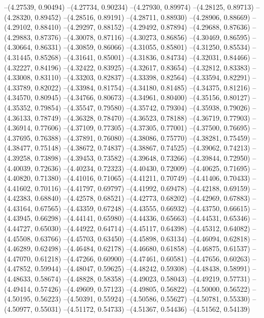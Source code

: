 --(4.27539, 0.90494)
--(4.27734, 0.90234)
--(4.27930, 0.89974)
--(4.28125, 0.89713)
--(4.28320, 0.89452)
--(4.28516, 0.89191)
--(4.28711, 0.88930)
--(4.28906, 0.88669)
--(4.29102, 0.88410)
--(4.29297, 0.88152)
--(4.29492, 0.87894)
--(4.29688, 0.87636)
--(4.29883, 0.87376)
--(4.30078, 0.87116)
--(4.30273, 0.86856)
--(4.30469, 0.86595)
--(4.30664, 0.86331)
--(4.30859, 0.86066)
--(4.31055, 0.85801)
--(4.31250, 0.85534)
--(4.31445, 0.85268)
--(4.31641, 0.85001)
--(4.31836, 0.84734)
--(4.32031, 0.84466)
--(4.32227, 0.84196)
--(4.32422, 0.83925)
--(4.32617, 0.83654)
--(4.32812, 0.83383)
--(4.33008, 0.83110)
--(4.33203, 0.82837)
--(4.33398, 0.82564)
--(4.33594, 0.82291)
--(4.33789, 0.82022)
--(4.33984, 0.81754)
--(4.34180, 0.81485)
--(4.34375, 0.81216)
--(4.34570, 0.80945)
--(4.34766, 0.80673)
--(4.34961, 0.80400)
--(4.35156, 0.80127)
--(4.35352, 0.79854)
--(4.35547, 0.79580)
--(4.35742, 0.79304)
--(4.35938, 0.79026)
--(4.36133, 0.78749)
--(4.36328, 0.78470)
--(4.36523, 0.78188)
--(4.36719, 0.77903)
--(4.36914, 0.77606)
--(4.37109, 0.77305)
--(4.37305, 0.77001)
--(4.37500, 0.76695)
--(4.37695, 0.76388)
--(4.37891, 0.76080)
--(4.38086, 0.75770)
--(4.38281, 0.75459)
--(4.38477, 0.75148)
--(4.38672, 0.74837)
--(4.38867, 0.74525)
--(4.39062, 0.74213)
--(4.39258, 0.73898)
--(4.39453, 0.73582)
--(4.39648, 0.73266)
--(4.39844, 0.72950)
--(4.40039, 0.72636)
--(4.40234, 0.72323)
--(4.40430, 0.72009)
--(4.40625, 0.71695)
--(4.40820, 0.71380)
--(4.41016, 0.71065)
--(4.41211, 0.70749)
--(4.41406, 0.70433)
--(4.41602, 0.70116)
--(4.41797, 0.69797)
--(4.41992, 0.69478)
--(4.42188, 0.69159)
--(4.42383, 0.68840)
--(4.42578, 0.68521)
--(4.42773, 0.68202)
--(4.42969, 0.67883)
--(4.43164, 0.67565)
--(4.43359, 0.67248)
--(4.43555, 0.66932)
--(4.43750, 0.66615)
--(4.43945, 0.66298)
--(4.44141, 0.65980)
--(4.44336, 0.65663)
--(4.44531, 0.65346)
--(4.44727, 0.65030)
--(4.44922, 0.64714)
--(4.45117, 0.64398)
--(4.45312, 0.64082)
--(4.45508, 0.63766)
--(4.45703, 0.63450)
--(4.45898, 0.63134)
--(4.46094, 0.62818)
--(4.46289, 0.62498)
--(4.46484, 0.62178)
--(4.46680, 0.61858)
--(4.46875, 0.61537)
--(4.47070, 0.61218)
--(4.47266, 0.60900)
--(4.47461, 0.60581)
--(4.47656, 0.60263)
--(4.47852, 0.59944)
--(4.48047, 0.59625)
--(4.48242, 0.59308)
--(4.48438, 0.58991)
--(4.48633, 0.58674)
--(4.48828, 0.58358)
--(4.49023, 0.58043)
--(4.49219, 0.57731)
--(4.49414, 0.57426)
--(4.49609, 0.57123)
--(4.49805, 0.56822)
--(4.50000, 0.56522)
--(4.50195, 0.56223)
--(4.50391, 0.55924)
--(4.50586, 0.55627)
--(4.50781, 0.55330)
--(4.50977, 0.55031)
--(4.51172, 0.54733)
--(4.51367, 0.54436)
--(4.51562, 0.54139)
